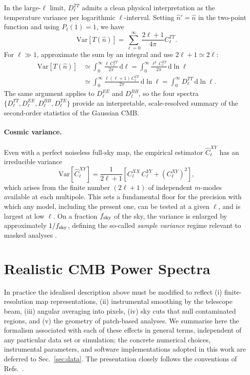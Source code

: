 \documentclass[11pt]{article}
\newcommand{\Var}{\mathrm{Var}}
\newcommand{\dd}{\mathrm{d}}
\theoremstyle{definition}
\begin{document}
In the large-\(\ell\) limit, \(D_\ell^{TT}\) admits a clean physical interpretation as the temperature variance per logarithmic \(\ell\)-interval. Setting \(\hat n'=\hat n\) in the two-point function and using \(P_\ell(1)=1\), we have
\begin{equation}
  \Var[T(\hat n)]
  =
  \sum_{\ell=0}^\infty \frac{2\ell+1}{4\pi} C_\ell^{TT}.
\end{equation}
For \(\ell \gg 1\), approximate the sum by an integral and use \(2\ell+1\simeq 2\ell\):
\begin{align}
  \Var[T(\hat n)]
  & \simeq \int_0^\infty \frac{\ell\,C_\ell^{TT}}{2\pi}\,\dd\ell
    = \int_0^\infty \frac{\ell^2\, C_\ell^{TT}}{2\pi}\,\dd\ln\ell \\
  & \simeq \int_0^\infty \frac{\ell(\ell+1)\, C_\ell^{TT}}{2\pi}\,\dd\ln\ell
    = \int_0^\infty D_\ell^{TT}\,\dd\ln\ell. \nonumber
\end{align}
The same argument applies to \(D_\ell^{EE}\) and \(D_\ell^{BB}\), so the four spectra \(\{D_\ell^{TT},D_\ell^{EE},D_\ell^{BB},D_\ell^{TE}\}\) provide an interpretable, scale-resolved summary of the second-order statistics of the Gaussian CMB.

\paragraph{Cosmic variance.} Even with a perfect noiseless full-sky map, the empirical estimator $\widehat C_\ell^{XY}$ has an irreducible variance \cite{scott2024pdg,sullivan2024methods}
\begin{equation}
  \Var\!\left[\widehat C_\ell^{XY}\right]
  = \frac{1}{2\ell+1}\!\left[C_\ell^{XX}\,C_\ell^{YY} + (C_\ell^{XY})^2\right],
\end{equation}
which arises from the finite number $(2\ell+1)$ of independent $m$-modes available at each multipole. This sets a fundamental floor for the precision with which any model, including the present one, can be tested at a given $\ell$, and is largest at low $\ell$. On a fraction $f_{\rm sky}$ of the sky, the variance is enlarged by approximately $1/f_{\rm sky}$, defining the so-called \emph{sample variance} regime relevant to masked analyses \cite{sullivan2024methods}.



\section{Realistic CMB Power Spectra}
\label{sec:realistic_spectra}
In practice the idealised description above must be modified to reflect (i) finite-resolution map representations, (ii) instrumental smoothing by the telescope beam, (iii) angular averaging into pixels, (iv) sky cuts that null contaminated regions, and (v) the geometry of patch-based analyses. We summarise here the formalism associated with each of these effects in general terms, independent of any particular data set or simulation; the concrete numerical choices, instrumental parameters, and software implementations adopted in this work are deferred to Sec.~\ref{sec:data}. The presentation closely follows the conventions of Refs.~\cite{gorski2005,sullivan2024methods,scott2024pdg}.
\end{document}
